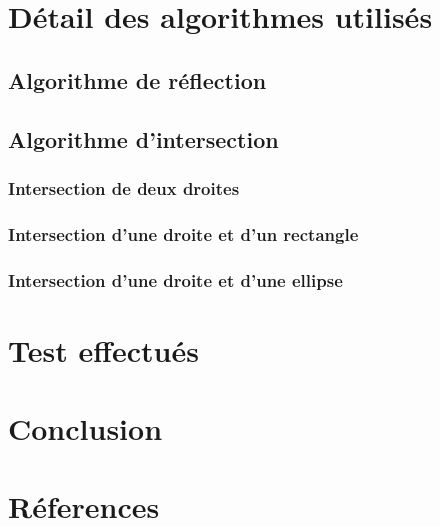 \documentclass[a4paper,11pt]{report}
\begin{document}
\chapter[Algorithmes]{Détail des algorithmes utilisés}
\section[Réflexion]{Algorithme de réflection}
\section[Intersection]{Algorithme d'intersection}
\subsection[Deux droites]{Intersection de deux droites}
\subsection[Droite et rectangle]{Intersection d'une droite et d'un rectangle}
\subsection[Droite et ellipse]{Intersection d'une droite et d'une ellipse}


\chapter{Test effectués}


\chapter{Conclusion}


\appendix

\chapter{Réferences}
\end{document}
